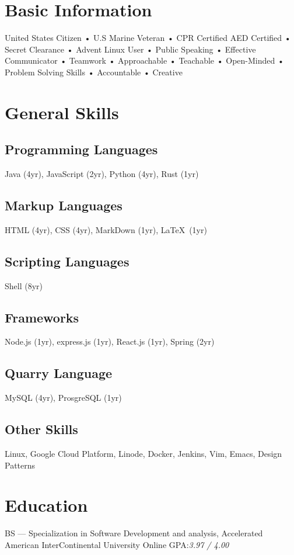 \documentclass{resume-class/nadario_resume}
\begin{document}
\makecvtitle{}
\section{Basic Information}
\begin{center}
United States Citizen • U.S Marine Veteran • CPR Certified AED Certified • Secret
Clearance • Advent Linux User • Public Speaking • Effective Communicator •
Teamwork • Approachable • Teachable • Open-Minded • Problem Solving Skills • Accountable • Creative
\end{center}

\section{General Skills}
\subsection{Programming Languages}
Java (4yr), JavaScript (2yr), Python (4yr), Rust (1yr)
\subsection{Markup Languages}
HTML (4yr), CSS (4yr), MarkDown (1yr), \LaTeX\ (1yr)
\subsection{Scripting Languages}
Shell (8yr)
\subsection{Frameworks}
Node.js (1yr), express.js (1yr), React.js (1yr), Spring (2yr)
\subsection{Quarry Language}
MySQL (4yr), ProsgreSQL (1yr)
\subsection{Other Skills}
Linux, Google Cloud Platform, Linode, Docker, Jenkins, Vim, Emacs, Design
Patterns

\section{Education}
        {BS --- Specialization in Software Development and analysis, Accelerated}
        {American InterContinental University}
        {Online}
        {}{GPA:\textit{3.97 / 4.00}}
        \vspace{.25cm}
\end{document}
